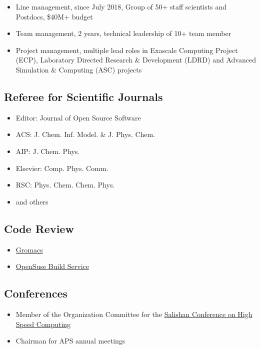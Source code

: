 \documentclass{article}
\begin{document}
\begin{itemize}
\setlength{\itemsep}{0pt}
\setlength{\parskip}{0pt}
\setlength{\parsep}{0pt}
\item Line management, since July 2018, Group of 50+ staff scientists and Postdocs, \$40M+ budget 
\item Team management, 2 years, technical leadership of 10+ team member
\item Project management, multiple lead roles in Exascale Computing Project (ECP), Laboratory Directed Research \& Development (LDRD) and Advanced Simulation \& Computing (ASC) projects 
\end{itemize}

\subsection*{Referee for Scientific Journals}

\begin{itemize}
\setlength{\itemsep}{0pt}
\setlength{\parskip}{0pt}
\setlength{\parsep}{0pt}
\item Editor: Journal of Open Source Software
\item ACS: J. Chem. Inf. Model. \& J. Phys. Chem.
\item AIP: J. Chem. Phys.
\item Elsevier: Comp. Phys. Comm.
\item RSC: Phys. Chem. Chem. Phys.
\item and others
\end{itemize}

\subsection*{Code Review}

\begin{itemize}
\setlength{\itemsep}{0pt}
\setlength{\parskip}{0pt}
\setlength{\parsep}{0pt}
\item \href{https://gitlab.com/gromacs/gromacs}{Gromacs}
\item \href{https://build.opensuse.org}{OpenSuse Build Service}
\end{itemize}

\subsection*{Conferences}

\begin{itemize}
\setlength{\itemsep}{0pt}
\setlength{\parskip}{0pt}
\setlength{\parsep}{0pt}
\item Member of the Organization Committee for the \href{http://salishan.ahsc-nm.org/}{Salishan Conference on High Speed Computing}
\item Chairman for APS annual meetings
\end{itemize}
\end{document}

